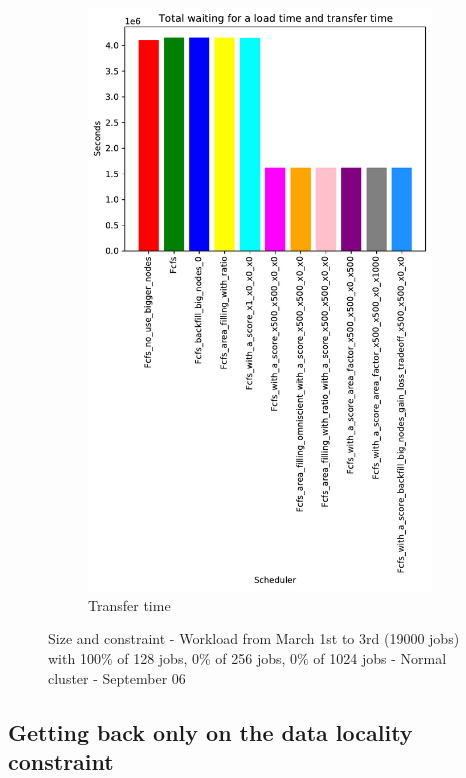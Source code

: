 \documentclass[a4paper]{article}
\begin{document}
\begin{figure}[H]
\begin{subfigure}[b]{0.4\linewidth}\centering\includegraphics[width=0.7\linewidth]{MBSS/plot/Results_Size_And_Data_2022-03-01->2022-03-03_V10000_Total_waiting_for_a_load_time_and_transfer_time_450_128_32_256_4_1024.pdf}\caption{Transfer time}\label{45}\end{subfigure}
\caption{Size and constraint - Workload from March 1st to 3rd (19000 jobs) with 100\% of 128 jobs, 0\% of 256 jobs, 0\% of 1024 jobs - Normal cluster - September 06}\label{49}\end{figure}

\subsection{Getting back only on the data locality constraint}
\end{document}
